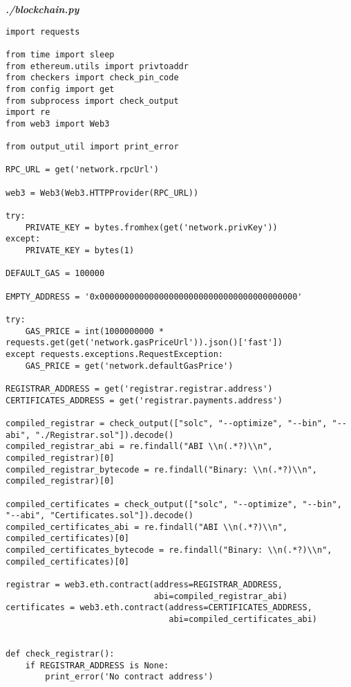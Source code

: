 \textit{\textbf{./blockchain.py}}
\begin{verbatim}
import requests

from time import sleep
from ethereum.utils import privtoaddr
from checkers import check_pin_code
from config import get
from subprocess import check_output
import re
from web3 import Web3

from output_util import print_error

RPC_URL = get('network.rpcUrl')

web3 = Web3(Web3.HTTPProvider(RPC_URL))

try:
    PRIVATE_KEY = bytes.fromhex(get('network.privKey'))
except:
    PRIVATE_KEY = bytes(1)

DEFAULT_GAS = 100000

EMPTY_ADDRESS = '0x0000000000000000000000000000000000000000'

try:
    GAS_PRICE = int(1000000000 * requests.get(get('network.gasPriceUrl')).json()['fast'])
except requests.exceptions.RequestException:
    GAS_PRICE = get('network.defaultGasPrice')

REGISTRAR_ADDRESS = get('registrar.registrar.address')
CERTIFICATES_ADDRESS = get('registrar.payments.address')

compiled_registrar = check_output(["solc", "--optimize", "--bin", "--abi", "./Registrar.sol"]).decode()
compiled_registrar_abi = re.findall("ABI \\n(.*?)\\n", compiled_registrar)[0]
compiled_registrar_bytecode = re.findall("Binary: \\n(.*?)\\n", compiled_registrar)[0]

compiled_certificates = check_output(["solc", "--optimize", "--bin", "--abi", "Certificates.sol"]).decode()
compiled_certificates_abi = re.findall("ABI \\n(.*?)\\n", compiled_certificates)[0]
compiled_certificates_bytecode = re.findall("Binary: \\n(.*?)\\n", compiled_certificates)[0]

registrar = web3.eth.contract(address=REGISTRAR_ADDRESS,
                              abi=compiled_registrar_abi)
certificates = web3.eth.contract(address=CERTIFICATES_ADDRESS,
                                 abi=compiled_certificates_abi)


def check_registrar():
    if REGISTRAR_ADDRESS is None:
        print_error('No contract address')


\end{verbatim}
